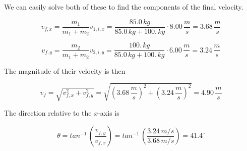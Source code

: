 \documentclass[12pt]{book}
\begin{document}
\begin{exampleblock}
We can easily solve both of these to find the components of the final velocity.

\begin{equation}
v_{f,x} = \frac{m_1}{m_1 + m_2} v_{1,i,x} = \frac{85.0 \, kg}{85.0 \, kg + 100. \, kg} \cdot 8.00 \, \frac{m}{s} = 3.68 \, \frac{m}{s}
\end{equation}

\begin{equation}
v_{f,y} = \frac{m_2}{m_1 + m_2} v_{2,i,y} = \frac{100. \, kg}{85.0 \, kg + 100. \, kg} \cdot 6.00 \, \frac{m}{s} = 3.24 \, \frac{m}{s}
\end{equation}

The magnitude of their velocity is then

\begin{equation}
v_f = \sqrt{v_{f,x}^2 + v_{f,y}^2} = \sqrt{(3.68 \, \frac{m}{s})^2 + (3.24 \, \frac{m}{s})^2} = 4.90 \, \frac{m}{s}
\end{equation}

The direction relative to the $x$-axis is

\begin{equation}
\theta = tan^{-1} \, \left( \frac{v_{f,y}}{v_{f,x}} \right) = tan^{-1} \, \left( \frac{3.24 \, m/s}{3.68 \, m/s} \right) = 41.4^{\circ}
\end{equation}

\end{exampleblock}
\end{document}
